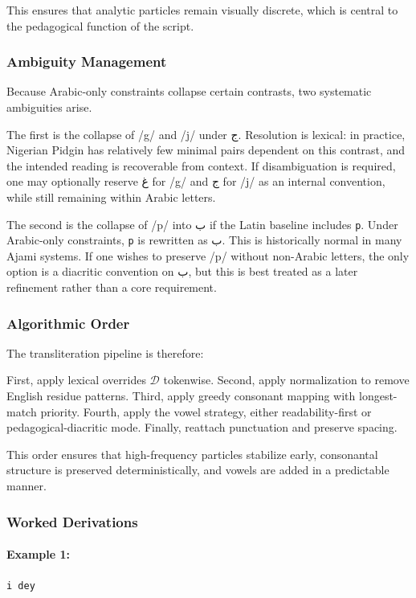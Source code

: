 \documentclass[12pt]{article}
\newcommand{\AR}[1]{\foreignlanguage{arabic}{#1}}
\begin{document}
This ensures that analytic particles remain visually discrete, which is central to the pedagogical function of the script.

\subsubsection{Ambiguity Management}

Because Arabic-only constraints collapse certain contrasts, two systematic ambiguities arise.

The first is the collapse of /g/ and /j/ under \AR{ج}. Resolution is lexical: in practice, Nigerian Pidgin has relatively few minimal pairs dependent on this contrast, and the intended reading is recoverable from context. If disambiguation is required, one may optionally reserve \AR{غ} for /g/ and \AR{ج} for /j/ as an internal convention, while still remaining within Arabic letters.

The second is the collapse of /p/ into \AR{ب} if the Latin baseline includes \texttt{p}. Under Arabic-only constraints, \texttt{p} is rewritten as \AR{ب}. This is historically normal in many Ajami systems. If one wishes to preserve /p/ without non-Arabic letters, the only option is a diacritic convention on \AR{ب}, but this is best treated as a later refinement rather than a core requirement.

\subsubsection{Algorithmic Order}

The transliteration pipeline is therefore:

First, apply lexical overrides $\mathcal{D}$ tokenwise. Second, apply normalization to remove English residue patterns. Third, apply greedy consonant mapping with longest-match priority. Fourth, apply the vowel strategy, either readability-first or pedagogical-diacritic mode. Finally, reattach punctuation and preserve spacing.

This order ensures that high-frequency particles stabilize early, consonantal structure is preserved deterministically, and vowels are added in a predictable manner.

\subsubsection{Worked Derivations}

\paragraph{Example 1:} \texttt{i dey}
\end{document}
